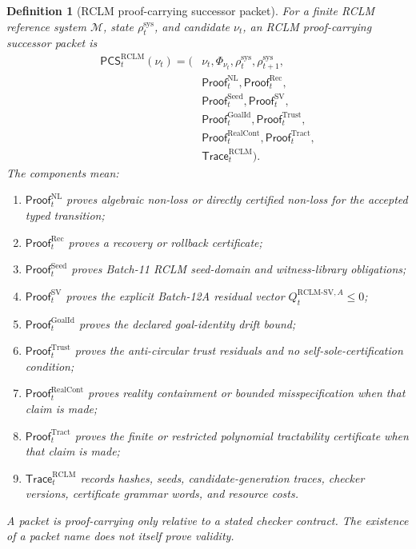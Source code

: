 \documentclass[11pt,a4paper]{article}
\newtheorem{definition}[theorem]{Definition}
\newcommand{\RCLM}{\mathrm{RCLM}}
\newcommand{\sys}{\mathrm{sys}}
\newcommand{\Rec}{\operatorname{Rec}}
\newcommand{\NL}{\mathrm{NL}}
\begin{document}
\begin{definition}[RCLM proof-carrying successor packet]
\label{def:rclm-batch13r-pcs}
For a finite RCLM reference system \(\mathcal M\), state \(\rho_t^{\sys}\), and candidate \(\nu_t\), an RCLM proof-carrying successor packet is
\[
\begin{aligned}
\mathsf{PCS}_t^{\RCLM}(\nu_t)=(&
\nu_t,
\Phi_{\nu_t},
\rho_t^{\sys},
\rho_{t+1}^{\sys},\\
&\mathsf{Proof}_t^{\NL},
\mathsf{Proof}_t^{\Rec},\\
&\mathsf{Proof}_t^{\mathrm{Seed}},
\mathsf{Proof}_t^{\mathrm{SV}},\\
&\mathsf{Proof}_t^{\mathrm{GoalId}},
\mathsf{Proof}_t^{\mathrm{Trust}},\\
&\mathsf{Proof}_t^{\mathrm{RealCont}},
\mathsf{Proof}_t^{\mathrm{Tract}},\\
&\mathsf{Trace}_t^{\RCLM}).
\end{aligned}
\]
The components mean:
\begin{enumerate}[label=(\roman*),leftmargin=1.5em]
    \item \(\mathsf{Proof}_t^{\NL}\) proves algebraic non-loss or directly certified non-loss for the accepted typed transition;
    \item \(\mathsf{Proof}_t^{\Rec}\) proves a recovery or rollback certificate;
    \item \(\mathsf{Proof}_t^{\mathrm{Seed}}\) proves Batch-11 RCLM seed-domain and witness-library obligations;
    \item \(\mathsf{Proof}_t^{\mathrm{SV}}\) proves the explicit Batch-12A residual vector \(Q_t^{\RCLM\text{-}\mathrm{SV},A}\le0\);
    \item \(\mathsf{Proof}_t^{\mathrm{GoalId}}\) proves the declared goal-identity drift bound;
    \item \(\mathsf{Proof}_t^{\mathrm{Trust}}\) proves the anti-circular trust residuals and no self-sole-certification condition;
    \item \(\mathsf{Proof}_t^{\mathrm{RealCont}}\) proves reality containment or bounded misspecification when that claim is made;
    \item \(\mathsf{Proof}_t^{\mathrm{Tract}}\) proves the finite or restricted polynomial tractability certificate when that claim is made;
    \item \(\mathsf{Trace}_t^{\RCLM}\) records hashes, seeds, candidate-generation traces, checker versions, certificate grammar words, and resource costs.
\end{enumerate}
A packet is proof-carrying only relative to a stated checker contract.  The existence of a packet name does not itself prove validity.
\end{definition}
\end{document}
